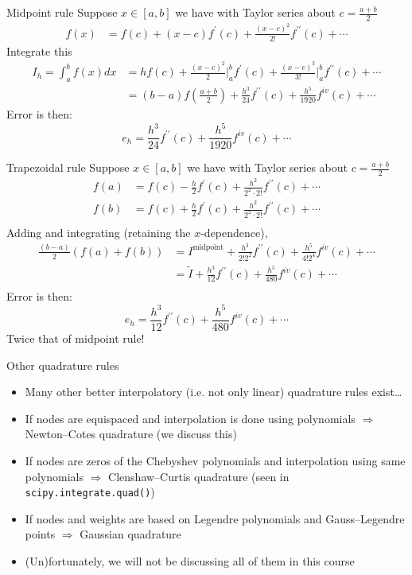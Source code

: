 \documentclass[presentation]{beamer}
\begin{document}
\begin{frame}[label={sec:org8da16e8}]{Midpoint rule}
Suppose \(x \in [a,b]\) we have with Taylor series about \(c = \frac{a +
   b}{2}\)
\[ \begin{aligned} f(x) &= f(c) + (x-c) f^\prime(c) +
   \frac{(x-c)^2}{2!}f^{\prime\prime}(c) + \cdots \end{aligned}\]
Integrate this
\[ \begin{aligned} I_{h} = \int_{a}^{b} f(x) dx &= hf(c) + \frac{(x-c)^2}{2} \biggr\rvert_{a}^{b} f^\prime(c) +
   \frac{(x-c)^3}{3!} \biggr\rvert_{a}^{b} f^{\prime\prime}(c) + \cdots \\
   & = (b-a) f \left( \frac{a + b}{2} \right) +
   \frac{h^3}{24}f^{\prime\prime}(c) + \frac{h^5}{1920}f^{iv}(c) + \cdots
   \end{aligned}\]
Error is then:
\[ e_h  = \frac{h^3}{24}f^{\prime\prime}(c) + \frac{h^5}{1920}f^{iv}(c) + \cdots\]
\end{frame}
\begin{frame}[label={sec:org3d6cbf0}]{Trapezoidal rule}
Suppose \(x \in [a,b]\) we have with Taylor series about \(c = \frac{a +
   b}{2}\)
\[ \begin{aligned} f(a) &= f(c) - \frac{h}{2} f^\prime(c) +
   \frac{h^2}{2^2 \cdot 2!}f^{\prime\prime}(c) + \cdots \\
   f(b) &= f(c) + \frac{h}{2} f^\prime(c) +
   \frac{h^2}{2^2 \cdot 2!}f^{\prime\prime}(c) + \cdots \\
   \end{aligned}\]
Adding and integrating (retaining the \(x\)-dependence),
\[ \begin{aligned}
   \frac{(b-a)}{2} \left( f(a) + f(b) \right) &= I^{\text{midpoint}} +
   \frac{h^3}{2!2^2}f^{\prime\prime}(c) + \frac{h^5}{4!2^4}f^{iv}(c) + \cdots \\
   &= \tilde{I} +  \frac{h^3}{12}f^{\prime\prime}(c) + \frac{h^5}{480}f^{iv}(c) + \cdots \\
   \end{aligned}\]
Error is then:
\[ e_h  = \frac{h^3}{12}f^{\prime\prime}(c) + \frac{h^5}{480}f^{iv}(c) + \cdots\]
\alert{Twice} that of midpoint rule!
\end{frame}
\begin{frame}[label={sec:org01ceaf0},fragile]{Other quadrature rules}
 \begin{itemize}
\item Many other better interpolatory (i.e. not only linear) quadrature rules exist\ldots{}
\item If nodes are equispaced and interpolation is done using polynomials
\(\Rightarrow\) \alert{Newton--Cotes} quadrature (we discuss this)
\item If nodes are zeros of the Chebyshev polynomials and interpolation using
same polynomials
\(\Rightarrow\) \alert{Clenshaw--Curtis} quadrature (seen in \texttt{scipy.integrate.quad()})
\item If nodes and weights are based on Legendre polynomials and Gauss--Legendre
points \(\Rightarrow\) \alert{Gaussian} quadrature
\item (Un)fortunately, we will not be discussing all of them in this course
\end{itemize}
\end{frame}
\end{document}
